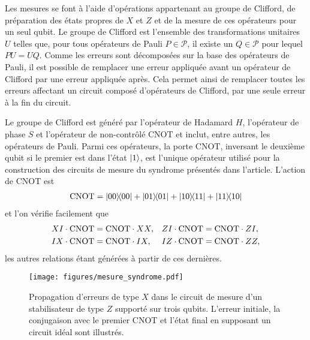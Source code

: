 Les mesures se font à l'aide d'opérations appartenant au groupe de Clifford,
de préparation des états propres de $X$ et $Z$ et de la mesure de ces opérateurs
pour un seul qubit.
Le groupe de Clifford est l'ensemble des transformations unitaires $U$ telles que,
pour tous opérateurs de Pauli $P \in \mathcal P$,
il existe un $Q \in \mathcal P$ pour lequel $PU = UQ$.
Comme les erreurs sont décomposées sur la base des opérateurs de Pauli,
il est possible de remplacer une erreur appliquée avant un opérateur de Clifford
par une erreur appliquée après.
Cela permet ainsi de remplacer toutes les erreurs affectant un circuit composé d'opérateurs de Clifford,
par une seule erreur à la fin du circuit.

Le groupe de Clifford est généré par l'opérateur de Hadamard $H$,
l'opérateur de phase $S$ et l'opérateur de non-contrôlé $\text{CNOT}$
et inclut, entre autres, les opérateurs de Pauli.
Parmi ces opérateurs,
la porte $\text{CNOT}$,
inversant le deuxième qubit si le premier est dans l'état $\ket{1}$,
est l'unique opérateur utilisé pour la construction des circuits de mesure du syndrome 
présentés dans l'article.
L'action de CNOT est 
\begin{align}
	\text{CNOT} = \op{00}{00} + \op{01}{01} + \op{10}{11} + \op{11}{10}
\end{align}
et l'on vérifie facilement que
\begin{align}
	&XI \cdot \text{CNOT} = \text{CNOT} \cdot XX,
	&&ZI \cdot \text{CNOT} = \text{CNOT} \cdot ZI, \notag \\
	&IX \cdot \text{CNOT} = \text{CNOT} \cdot IX,
	&&IZ \cdot \text{CNOT} = \text{CNOT} \cdot ZZ,
	\label{eq:cnot_pauli}
\end{align}
les autres relations étant générées à partir de ces dernières.

\begin{figure}
	\centering
	\texttt{[image: figures/mesure\_syndrome.pdf]}
	\caption[Exemple de mesure de syndrome]{
		Propagation d'erreurs de type $X$ dans le circuit de mesure d'un
		stabilisateur de type $Z$ supporté sur trois qubits.
		L'erreur initiale, la conjugaison avec le premier CNOT 
		et l'état final en supposant un circuit idéal sont illustrés.
	}
	\label{fig:mesure_syndrome}
\end{figure}

